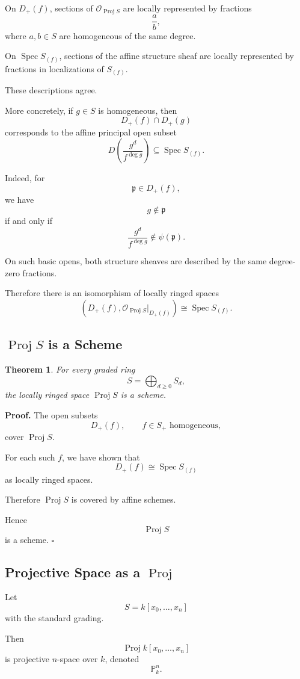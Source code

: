 \documentclass[12pt,a4paper]{article}
\DeclareMathOperator{\Spec}{Spec}
\DeclareMathOperator{\Proj}{Proj}
\newtheorem{theorem}{Theorem}[section]
\theoremstyle{notespace}
\begin{document}
On \(D_+(f)\), sections of \(\mathcal O_{\Proj S}\) are locally represented by fractions
\[
\frac{a}{b},
\]
where \(a,b\in S\) are homogeneous of the same degree.

On \(\Spec S_{(f)}\), sections of the affine structure sheaf are locally represented by
fractions in localizations of \(S_{(f)}\).

These descriptions agree.

More concretely, if \(g\in S\) is homogeneous, then
\[
D_+(f)\cap D_+(g)
\]
corresponds to the affine principal open subset
\[
D\left(\frac{g^d}{f^{\deg g}}\right)
\subseteq
\Spec S_{(f)}.
\]

Indeed, for
\[
\mathfrak p\in D_+(f),
\]
we have
\[
g\notin\mathfrak p
\]
if and only if
\[
\frac{g^d}{f^{\deg g}}\notin \psi(\mathfrak p).
\]

On such basic opens, both structure sheaves are described by the same degree-zero
fractions.

Therefore there is an isomorphism of locally ringed spaces
\[
\left(D_+(f),\mathcal O_{\Proj S}|_{D_+(f)}\right)
\cong
\Spec S_{(f)}.
\]

\subsection{\texorpdfstring{$\Proj S$}{Proj S} is a Scheme}

\begin{theorem}
	For every graded ring
	\[
	S=\bigoplus_{d\ge 0}S_d,
	\]
	the locally ringed space \(\Proj S\) is a scheme.
\end{theorem}

\textbf{Proof.}
The open subsets
\[
D_+(f),
\qquad
f\in S_+ \text{ homogeneous},
\]
cover \(\Proj S\).

For each such \(f\), we have shown that
\[
D_+(f)\cong\Spec S_{(f)}
\]
as locally ringed spaces.

Therefore \(\Proj S\) is covered by affine schemes.

Hence
\[
\Proj S
\]
is a scheme.
\(\square\)

\subsection{Projective Space as a \texorpdfstring{$\Proj$}{Proj}}

Let
\[
S=k[x_0,\dots,x_n]
\]
with the standard grading.

Then
\[
\Proj k[x_0,\dots,x_n]
\]
is projective \(n\)-space over \(k\), denoted
\[
\mathbb P_k^n.
\]
\end{document}
